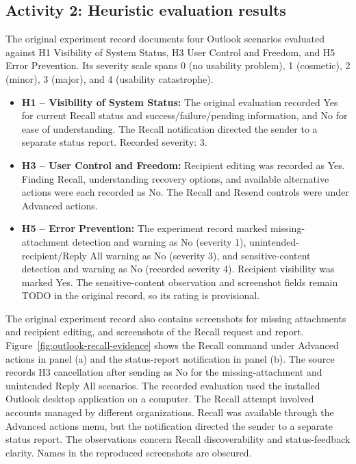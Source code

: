 \documentclass[letterpaper]{jdf}
\begin{document}
\subsection{Activity 2: Heuristic evaluation results}\label{app:needfinding-heuristic}
The original experiment record documents four Outlook scenarios evaluated against H1 Visibility of System Status, H3 User Control and Freedom, and H5 Error Prevention. Its severity scale spans 0 (no usability problem), 1 (cosmetic), 2 (minor), 3 (major), and 4 (usability catastrophe).
\begin{itemize}
\item \textbf{H1 -- Visibility of System Status:} The original evaluation recorded Yes for current Recall status and success/failure/pending information, and No for ease of understanding. The Recall notification directed the sender to a separate status report. Recorded severity: 3.
\item \textbf{H3 -- User Control and Freedom:} Recipient editing was recorded as Yes. Finding Recall, understanding recovery options, and available alternative actions were each recorded as No. The Recall and Resend controls were under Advanced actions.
\item \textbf{H5 -- Error Prevention:} The experiment record marked missing-attachment detection and warning as No (severity 1), unintended-recipient/Reply All warning as No (severity 3), and sensitive-content detection and warning as No (recorded severity 4). Recipient visibility was marked Yes. The sensitive-content observation and screenshot fields remain TODO in the original record, so its rating is provisional.
\end{itemize}
The original experiment record also contains screenshots for missing attachments and recipient editing, and screenshots of the Recall request and report. Figure~\ref{fig:outlook-recall-evidence} shows the Recall command under Advanced actions in panel (a) and the status-report notification in panel (b). The source records H3 cancellation after sending as No for the missing-attachment and unintended Reply All scenarios. The recorded evaluation used the installed Outlook desktop application on a computer. The Recall attempt involved accounts managed by different organizations. Recall was available through the Advanced actions menu, but the notification directed the sender to a separate status report. The observations concern Recall discoverability and status-feedback clarity. Names in the reproduced screenshots are obscured.
\end{document}
